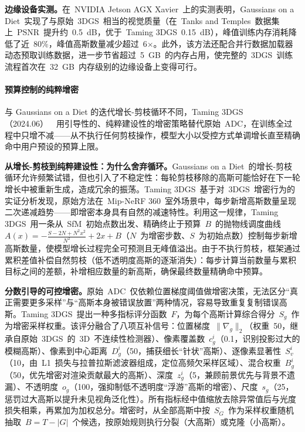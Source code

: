 \textbf{边缘设备实测。}在~NVIDIA Jetson AGX Xavier~上的实测表明，Gaussians on a Diet~实现了与原始~3DGS~相当的视觉质量（在~Tanks and Temples~数据集上~PSNR~提升约~0.5~dB，优于~Taming 3DGS~0.15~dB），峰值训练内存消耗降低了近~80\%，峰值高斯数量减少超过~6$\times$。此外，该方法还配合并行数据加载器动态预取训练数据，进一步节省超过~5~GB~的内存占用，使完整的~3DGS~训练流程首次在~32~GB~内存级别的边缘设备上变得可行。

\paragraph{预算控制的纯粹增密}

与 Gaussians on a Diet 的迭代增长-剪枝循环不同，Taming 3DGS（2024.06）~\cite{2406_15643}~用引导性的、纯粹建设性的增密策略替代原始~ADC，在训练全过程中只增不减——从不执行任何剪枝操作，模型大小以受控方式单调增长直至精确命中用户预设的预算上限。

\textbf{从增长-剪枝到纯粹建设性：为什么舍弃循环。}Gaussians on a Diet~的增长-剪枝循环允许频繁试错，但也引入了不稳定性：每轮剪枝移除的高斯可能恰好在下一轮增长中被重新生成，造成冗余的振荡。Taming 3DGS~基于对~3DGS~增密行为的实证分析发现，原始方法在~Mip-NeRF 360~室外场景中，每步新增高斯数量呈现二次递减趋势——即增密本身具有自然的减速特性。利用这一规律，Taming 3DGS~用一条从~SfM~初始点数出发、精确终止于预算~$B$~的抛物线调度曲线~$A(x) = -\frac{S-2N+N^2x^2}{N^2} + 2x + B$（$N$~为增密步数、$S$~为初始点数）控制每步新增高斯数量，使模型增长过程完全可预测且无峰值溢出。由于不执行剪枝，框架通过累积差值补偿自然剪枝（低不透明度高斯的逐渐消失）：每步计算当前数量与累积目标之间的差额，补增相应数量的新高斯，确保最终数量精确命中预算。

\textbf{分数引导的可控增密。}原始~ADC~仅依赖位置梯度阈值做增密决策，无法区分``真正需要更多采样''与``高斯本身被错误放置''两种情况，容易导致重复复制错误高斯。Taming 3DGS~提出一种多指标评分函数~$F$，为每个高斯计算综合得分~$S_g$~作为增密采样权重。该评分融合了八项互补信号：位置梯度~$\|\nabla_g\|_2$（权重~50，继承自原始~3DGS~的~3D~不连续性检测器）、像素覆盖数~$c_g^i$（0.1，识别投影过大的模糊高斯）、像素到中心距离~$D_g^i$（50，捕获细长``针状''高斯）、逐像素显著性~$S_v^i$（10，由~L1~损失与拉普拉斯滤波器组成，定位高频欠采样区域）、混合权重~$B_g^i$（50，优先增密对渲染贡献最大的高斯）、深度~$z_g^i$（5，兼顾前景优先与背景不遗漏）、不透明度~$o_g$（100，强抑制低不透明度``浮游''高斯的增密）、尺度~$s_g$（25，惩罚过大高斯以提升未见视角泛化性）。所有指标经中值缩放去除异常值后与光度损失相乘，再累加为加权总分。增密时，从全部高斯中按~$S_G$~作为采样权重随机抽取~$B = T - |G|$~个候选，按原始规则执行分裂（大高斯）或克隆（小高斯）。

